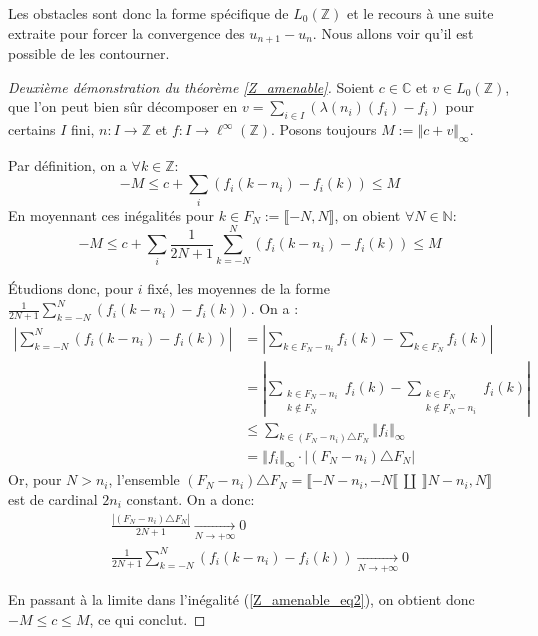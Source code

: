 \documentclass[a4paper,12pt]{article}
\newcommand{\N}{\mathbb{N}}
\newcommand{\Z}{\mathbb{Z}}
\newcommand{\C}{\mathbb{C}}
\newcommand{\norm}[1]{\left\Vert #1\right\Vert}
\newcommand{\abs}[1]{\left\vert#1\right\vert}
\newcommand{\card}[1]{\abs{#1}}
\begin{document}
Les obstacles sont donc la forme spécifique de $L_0(\Z)$ et le recours à une suite extraite pour forcer la convergence des $u_{n+1}-u_n$. Nous allons voir 
qu'il est possible de les contourner.

\begin{proof}[Deuxième démonstration du théorème \ref{Z_amenable}]
    Soient $c\in\C$ et $v\in L_0(\Z)$, que l'on peut bien sûr décomposer en $v = \sum_{i\in I} (\lambda(n_i)(f_i) - f_i)$ pour certains $I$ fini, $n : I \to\Z$ et
    $f : I\to\ell^\infty(\Z)$. Posons toujours $M := \norm{c + v}_\infty$.

    Par définition, on a $\forall k\in\Z$:
    \begin{equation*}
        -M \le c + \sum_i (f_i(k-n_i) - f_i(k)) \le M
    \end{equation*}
    En moyennant ces inégalités pour $k\in F_N := \llbracket-N,N\rrbracket$, on obient $\forall N\in\N$:
    \begin{equation}\label{Z_amenable_eq2}
        -M \le c + \sum_i \frac1{2N+1} \sum_{k=-N}^N (f_i(k-n_i) - f_i(k)) \le M
    \end{equation}

    Étudions donc, pour $i$ fixé, les moyennes de la forme $\frac1{2N+1} \sum_{k=-N}^N (f_i(k-n_i) - f_i(k))$. On a :
    \begin{align*}
        \abs{\sum_{k=-N}^N (f_i(k-n_i) - f_i(k))} &= \abs{\sum_{k\in F_N - n_i} f_i(k) - \sum_{k\in F_N}f_i(k)} \\
            &= \abs{\sum_{\substack{k\in F_N - n_i \\ k\notin F_N}} f_i(k) -
            \sum_{\substack{k\in F_N \\ k\notin F_N-n_i}} f_i(k)} \\
            &\le \sum_{k\in (F_N-n_i)\triangle F_N} \norm{f_i}_\infty \\
            &=\norm{f_i}_\infty \cdot \card{(F_N-n_i)\triangle F_N}
    \end{align*}
    Or, pour $N>n_i$, l'ensemble $(F_N-n_i)\triangle F_N = \llbracket -N-n_i, -N\llbracket\ \amalg\ \rrbracket N-n_i, N\rrbracket$ est de cardinal $2n_i$ constant.
    On a donc:
    \begin{gather*}
        \frac{\card{(F_N-n_i)\triangle F_N}}{2N+1} \xrightarrow[N\to+\infty]{} 0 \\
        \frac1{2N+1} \sum_{k=-N}^N (f_i(k-n_i) - f_i(k)) \xrightarrow[N\to+\infty]{} 0
    \end{gather*}

    En passant à la limite dans l'inégalité (\ref{Z_amenable_eq2}), on obtient donc $-M\le c\le M$, ce qui conclut.
\end{proof}
\end{document}
